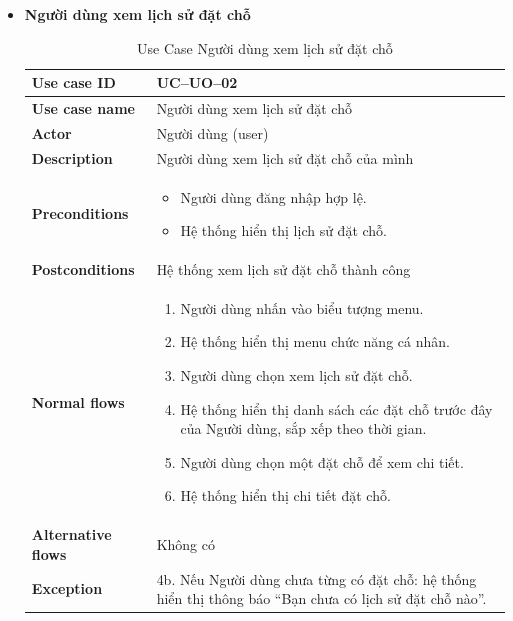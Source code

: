 \begin{itemize}
\item \textbf{Người dùng xem lịch sử đặt chỗ}
\begin{longtable}{|m{}|m{}|}
          \caption{Use Case Người dùng xem lịch sử đặt chỗ} \\
  \hline
  \textbf{Use case ID} & UC--UO--02 \\
  \hline
  \textbf{Use case name} & Người dùng xem lịch sử đặt chỗ \\
  \hline
  \textbf{Actor} & Người dùng (user) \\
  \hline
  \textbf{Description} & Người dùng xem lịch sử đặt chỗ của mình \\
  \hline
  \textbf{Preconditions} &
  \begin{itemize}
    \item Người dùng đăng nhập hợp lệ.
    \item Hệ thống hiển thị lịch sử đặt chỗ.
  \end{itemize}\\
  \hline
  \textbf{Postconditions} & Hệ thống xem lịch sử đặt chỗ thành công \\
  \hline
  \textbf{Normal flows} &
  \begin{enumerate}[label=\arabic*.]
    \item Người dùng nhấn vào biểu tượng menu.
    \item Hệ thống hiển thị menu chức năng cá nhân.
    \item Người dùng chọn xem lịch sử đặt chỗ.
    \item Hệ thống hiển thị danh sách các đặt chỗ trước đây của Người dùng, sắp xếp theo thời gian.
    \item Người dùng chọn một đặt chỗ để xem chi tiết.
    \item Hệ thống hiển thị chi tiết đặt chỗ.
  \end{enumerate}\\
  \hline
  \textbf{Alternative flows} & Không có\\
  \hline
  \textbf{Exception} &
  4b. Nếu Người dùng chưa từng có đặt chỗ: hệ thống hiển thị thông báo “Bạn chưa có lịch sử đặt chỗ nào”.\\
  \hline
  \end{longtable}


\end{itemize}
